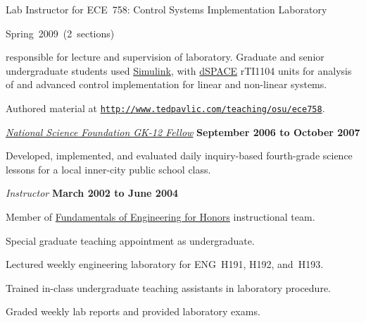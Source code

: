 \documentclass{article}
\providecommand*\url[1]{\href{#1}{#1}}
\renewcommand*\url[1]{\href{#1}{\texttt{#1}}}
\begin{document}
\begin{outerlist}
\begin{innerlist}
        \item Lab Instructor for ECE~758: Control Systems Implementation
            Laboratory
        \begin{innerlist}
            \item Spring~2009~(2~sections)


            \item responsible for lecture and supervision of laboratory.
                Graduate and senior undergraduate students used
                \href{http://www.mathworks.com/products/simulink/}{Simulink},
                with \href{http://www.dspaceinc.com/}{dSPACE} rTI1104
                units for analysis of and advanced control implementation
                for linear and non-linear systems.

            \item Authored material at
                \url{http://www.tedpavlic.com/teaching/osu/ece758}.
        \end{innerlist}
    \end{innerlist}

\item[] \href{http://www.nsfgk12.org/}
        {\emph{National Science Foundation GK-12 Fellow}}
        \hfill \textbf{September 2006 to October 2007}
\begin{innerlist}
    \item[] Developed, implemented, and evaluated daily inquiry-based
        fourth-grade science lessons for a local inner-city public
        school class.
\end{innerlist}

\item[] \textit{Instructor}%
        \hfill \textbf{March 2002 to June 2004}
\begin{innerlist}
\item Member of \href{http://feh.eng.ohio-state.edu/}
                     {Fundamentals of Engineering for Honors}
      instructional team.
\item Special graduate teaching appointment as undergraduate.
\item Lectured weekly engineering laboratory for ENG~H191,
        H192, and~H193.
\item Trained in-class undergraduate teaching assistants in laboratory
        procedure.
\item Graded weekly lab reports and provided laboratory exams.
\end{innerlist}


\end{outerlist}
\end{document}
